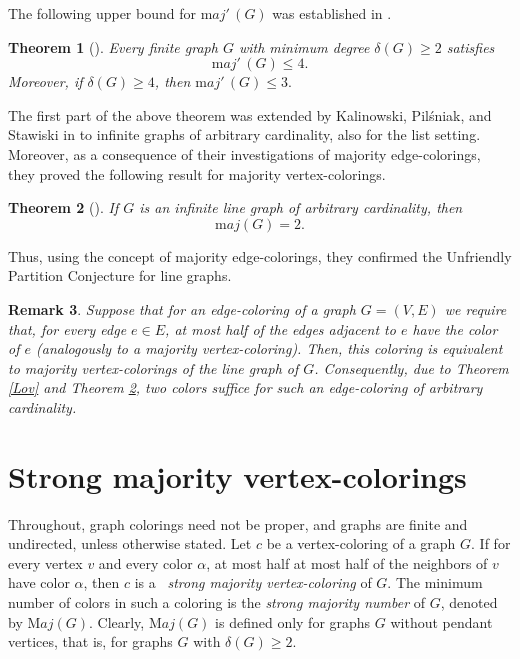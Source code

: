\documentclass[11pt]{article}
\newtheorem{theorem}{Theorem}
\newtheorem{remark}[theorem]{Remark}
\begin{document}
The following upper bound for ${\mathrm maj'\,}(G)$ was established in \cite{BKPPRW23}.

\begin{theorem} [\cite{BKPPRW23}]
Every finite graph $G$ with minimum degree $\delta(G)\ge 2$ satisfies  $${\mathrm maj'\,}(G)\le 4.$$
Moreover, if $\delta(G)\ge 4$, then ${\mathrm maj'\,}(G)\le 3.$
\end{theorem}
The first part of the above theorem was extended by Kalinowski, Pil\'sniak, and Stawiski in \cite{KPS25} to infinite graphs of arbitrary cardinality, also for the list setting. Moreover, as a consequence of their investigations of majority edge-colorings, they proved the following result for majority vertex-colorings.
\begin{theorem} [\cite{KPS25}]\label{line}
If $G$ is an infinite line graph of arbitrary cardinality, then $${\mathrm maj}(G)=2.$$    
\end{theorem}
Thus, using the concept of majority edge-colorings, they confirmed the Unfriendly Partition Conjecture for line graphs. 

\vspace{5mm} 
\begin{remark}
{\rm Suppose that for an edge-coloring of a graph $G=(V,E)$ we require that, for every edge $e\in E$, at most half of the edges adjacent to $e$ have the color of $e$ (analogously to a majority vertex-coloring). Then, this coloring is equivalent to  majority vertex-colorings of the line graph of $G$. Consequently,  due to Theorem {\rm \ref{Lov}} and Theorem {\rm \ref{line}}, two colors suffice for such an edge-coloring of arbitrary cardinality. } 
\end{remark}


\section{Strong majority vertex-colorings}

Throughout, graph colorings need not be proper, and graphs are finite  and undirected, unless otherwise stated. 
Let $c$ be a vertex-coloring of a graph $G$. If for every vertex $v$ and every color $\alpha$, at most half at most half of the neighbors of $v$ have color $\alpha$, then $c$ is a~ {\it strong majority vertex-coloring} of $G$. The minimum number of colors in such a coloring is the {\it strong majority number} of $G$, denoted by ${\mathrm Maj}(G)$. Clearly, ${\mathrm Maj}(G)$ is defined only for graphs $G$ without pendant vertices, that is, for graphs $G$ with $\delta(G)\ge 2$.
\end{document}
